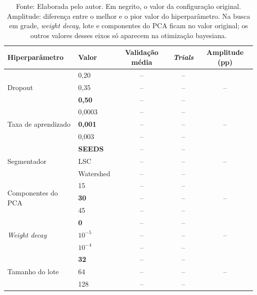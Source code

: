 \begin{table}[H]
    \centering
    \caption{Acurácia de validação média por valor de cada hiperparâmetro (486 \textit{trials} do experimento 04, Indian Pines, 10\% do treino)}
    \begin{tabular}{|l|l|c|c|c|}
        \hline
        \rowcolor[HTML]{C0C0C0}
        \textbf{Hiperparâmetro} & \textbf{Valor} & \textbf{Validação média} & \textbf{\textit{Trials}} & \textbf{Amplitude (pp)} \\
        \hline
        \multirow{3}{*}{Dropout} & 0,20 & -- & -- & \multirow{3}{*}{--} \\ \cline{2-4}
         & 0,35 & -- & -- &  \\ \cline{2-4}
         & \textbf{0,50} & -- & -- &  \\ \hline
        \multirow{3}{*}{Taxa de aprendizado} & 0,0003 & -- & -- & \multirow{3}{*}{--} \\ \cline{2-4}
         & \textbf{0,001} & -- & -- &  \\ \cline{2-4}
         & 0,003 & -- & -- &  \\ \hline
        \multirow{3}{*}{Segmentador} & \textbf{SEEDS} & -- & -- & \multirow{3}{*}{--} \\ \cline{2-4}
         & LSC & -- & -- &  \\ \cline{2-4}
         & Watershed & -- & -- &  \\ \hline
        \multirow{3}{*}{Componentes do PCA} & 15 & -- & -- & \multirow{3}{*}{--} \\ \cline{2-4}
         & \textbf{30} & -- & -- &  \\ \cline{2-4}
         & 45 & -- & -- &  \\ \hline
        \multirow{3}{*}{\textit{Weight decay}} & \textbf{0} & -- & -- & \multirow{3}{*}{--} \\ \cline{2-4}
         & $10^{-5}$ & -- & -- &  \\ \cline{2-4}
         & $10^{-4}$ & -- & -- &  \\ \hline
        \multirow{3}{*}{Tamanho do lote} & \textbf{32} & -- & -- & \multirow{3}{*}{--} \\ \cline{2-4}
         & 64 & -- & -- &  \\ \cline{2-4}
         & 128 & -- & -- &  \\ \hline
    \end{tabular}
    \captionsetup{justification=raggedright}
    \caption*{Fonte: Elaborada pelo autor. Em negrito, o valor da configuração original. Amplitude: diferença entre o melhor e o pior valor do hiperparâmetro. Na busca em grade, \textit{weight decay}, lote e componentes do PCA ficam no valor original; os outros valores desses eixos só aparecem na otimização bayesiana. }
    \label{tab:eixos}
\end{table}

